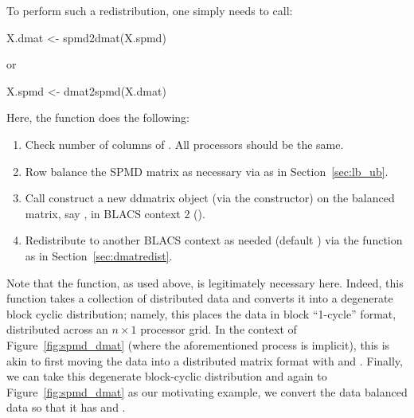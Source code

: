 To perform such a redistribution, one simply needs to call:
\begin{Code}[title=R Code]
X.dmat <- spmd2dmat(X.spmd)
\end{Code}
or
\begin{Code}[title=R Code]
X.spmd <- dmat2spmd(X.dmat)
\end{Code}
Here, the  function does the following:
\begin{enumerate}
\item Check number of columns of .  All
      processors should be the same.
\item Row balance the SPMD matrix as necessary via  as in Section~\ref{sec:lb_ub}.
\item Call construct a new ddmatrix object (via the  constructor) on the balanced matrix,
      say , in BLACS context 2 ().
\item Redistribute  to another BLACS context as needed 
      (default ) via the  function as in Section~\ref{sec:dmatredist}.
\end{enumerate}
Note that the  function, as used above, is legitimately necessary here.  Indeed, this function takes a collection of distributed data and converts it into a degenerate block cyclic distribution; namely, this places the data in block ``1-cycle'' format, distributed across an $n\times 1$ processor grid.  In the context of Figure~\ref{fig:spmd_dmat} (where the aforementioned process is implicit), this is akin to first moving the data into a distributed matrix format with  and .  Finally, we can take this degenerate block-cyclic distribution and again to Figure~\ref{fig:spmd_dmat} as our motivating example, we convert the data balanced data so that it has  and .

